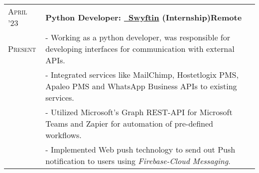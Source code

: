 \documentclass[a4paper,10pt]{extarticle} %
\begin{document}
\begin{tabularx}{\linewidth}{ l | X }
\textsc{April '23} & \textbf{Python Developer: {\href{https://www.swyftin.com/}{\ Swyftin} (Internship)}}\hfill\textbf{Remote}\\
\textsc{Present}& {- Working as a python developer, was responsible for developing interfaces for communication with external APIs.}\\
& {- Integrated services like MailChimp, Hostetlogix PMS, Apaleo PMS and WhatsApp Business APIs to existing services.}\\
& {- Utilized Microsoft's Graph REST-API for Microsoft Teams and Zapier for automation of pre-defined workflows.}\\
& {- Implemented Web push technology to send out Push notification to users using \textit{Firebase-Cloud Messaging}.}\\





\end{tabularx}
\end{document}

